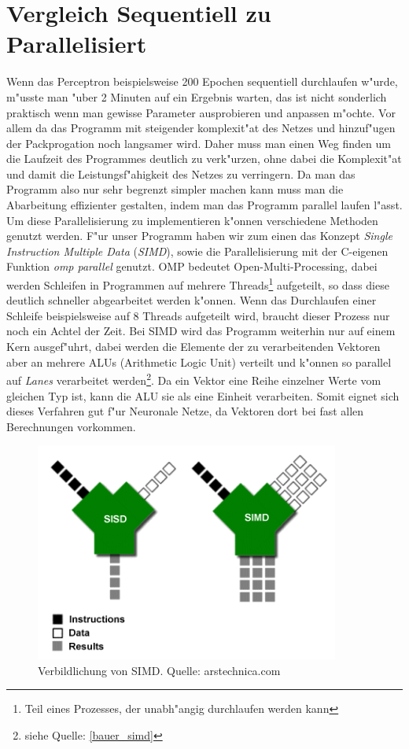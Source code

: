 \documentclass[12pt,a4paper]{scrartcl}
\begin{document}
\pagebreak

\section{Vergleich Sequentiell zu Parallelisiert}

Wenn das Perceptron beispielsweise 200 Epochen sequentiell durchlaufen w"urde, m"usste man "uber 2 Minuten auf ein Ergebnis warten, das ist nicht sonderlich praktisch wenn man gewisse Parameter ausprobieren und anpassen m"ochte. Vor allem da das Programm mit steigender komplexit"at des Netzes und hinzuf"ugen der Packprogation noch langsamer wird. Daher muss man einen Weg finden um die Laufzeit des Programmes deutlich zu verk"urzen, ohne dabei die Komplexit"at und damit die Leistungsf"ahigkeit des Netzes zu verringern. Da man das Programm also nur sehr begrenzt simpler machen kann muss man die Abarbeitung effizienter gestalten, indem man das Programm parallel laufen l"asst. \\

Um diese Parallelisierung zu implementieren k"onnen verschiedene Methoden genutzt werden. F"ur unser Programm haben wir zum einen das Konzept \textit{Single Instruction Multiple Data} (\textit{SIMD}), sowie die Parallelisierung mit der C-eigenen Funktion \textit{omp parallel} genutzt. OMP bedeutet Open-Multi-Processing, dabei werden Schleifen in Programmen auf mehrere Threads\footnote{Teil eines Prozesses, der unabh"angig durchlaufen werden kann} aufgeteilt, so dass diese deutlich schneller abgearbeitet werden k"onnen. Wenn das Durchlaufen einer Schleife beispielsweise auf 8 Threads aufgeteilt wird, braucht dieser Prozess nur noch ein Achtel der Zeit. Bei SIMD wird das Programm weiterhin nur auf einem Kern ausgef"uhrt, dabei werden die Elemente der zu verarbeitenden Vektoren aber an mehrere ALUs (Arithmetic Logic Unit) verteilt und k"onnen so parallel auf \textit{Lanes} verarbeitet werden\footnote{siehe Quelle: \ref{bauer_simd}}. Da ein Vektor eine Reihe einzelner Werte vom gleichen Typ ist, kann die ALU sie als eine Einheit verarbeiten. Somit eignet sich dieses Verfahren gut f"ur Neuronale Netze, da Vektoren dort bei fast allen Berechnungen vorkommen.

\begin{figure}[h]
	\centering
	\includegraphics[width=10cm]{screens/ars_simd.png}
	\caption{Verbildlichung von SIMD. Quelle: arstechnica.com} \label{ars_simd}
\end{figure}
\end{document}

